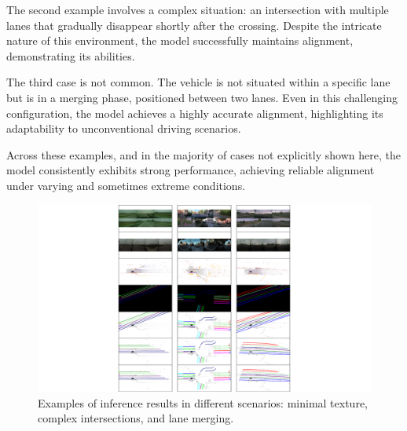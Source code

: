 The second example involves a complex situation: an intersection with multiple lanes that gradually disappear shortly after the crossing. Despite the intricate nature of this environment, the model successfully maintains alignment, demonstrating its abilities.

The third case is not common. The vehicle is not situated within a specific lane but is in a merging phase, positioned between two lanes. Even in this challenging configuration, the model achieves a highly accurate alignment, highlighting its adaptability to unconventional driving scenarios.

Across these examples, and in the majority of cases not explicitly shown here, the model consistently exhibits strong performance, achieving reliable alignment under varying and sometimes extreme conditions.
\begin{figure}[H]
    \centering
    \includegraphics[width=1\linewidth]{LateX//figs/bev_inference.pdf}
    \caption{Examples of inference results in different scenarios: minimal texture, complex intersections, and lane merging.}
    \label{fig:bev_inference_2}
\end{figure}
